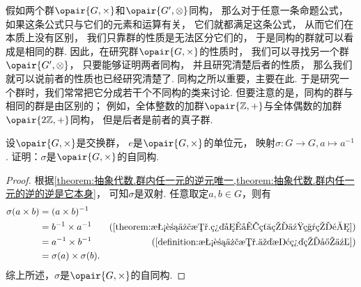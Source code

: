 假如两个群\(\opair{G,\times}\)和\(\opair{G',\otimes}\)同构，
那么对于任意一条命题公式，
如果这条公式只与它们的元素和运算有关，
它们就都满足这条公式，
从而它们在本质上没有区别，
我们只靠群的性质是无法区分它们的，
于是同构的群就可以看成是相同的群.
因此，在研究群\(\opair{G,\times}\)的性质时，
我们可以寻找另一个群\(\opair{G',\otimes}\)，
只要能够证明两者同构，
并且研究清楚后者的性质，
那么我们就可以说前者的性质也已经研究清楚了.
同构之所以重要，主要在此.
于是研究一个群时，我们常常把它分成若干个不同构的类来讨论.
但要注意的是，同构的群与相同的群是由区别的；
例如，全体整数的加群\(\opair{\mathbb{Z},+}\)与全体偶数的加群\(\opair{2\mathbb{Z},+}\)同构，
但是后者是前者的真子群.

\begin{example}
设\(\opair{G,\times}\)是交换群，
\(e\)是\(\opair{G,\times}\)的单位元，
映射\(\sigma\colon G\to G, a\mapsto a^{-1}\).
证明：\(\sigma\)是\(\opair{G,\times}\)的自同构.
\begin{proof}
根据\cref{theorem:抽象代数.群内任一元的逆元唯一,theorem:抽象代数.群内任一元的逆的逆是它本身}，
可知\(\sigma\)是双射.
任意取定\(a,b\in G\)，则有
\begin{align*}
	\sigma(a \times b)
	&= (a \times b)^{-1} \\
	&= b^{-1} \times a^{-1}
		&(\text{\cref{theorem:抽象代数.群内元素的乘积的逆}}) \\
	&= a^{-1} \times b^{-1}
		&(\text{\cref{definition:抽象代数.交换群的定义}}) \\
	&= \sigma(a) \times \sigma(b).
\end{align*}
综上所述，\(\sigma\)是\(\opair{G,\times}\)的自同构.
\end{proof}
\end{example}

